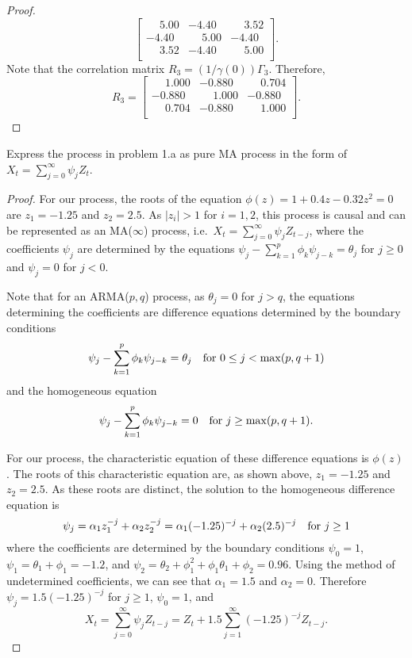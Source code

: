 \documentclass[12pt]{article}
\theoremstyle{definition}
\newenvironment{custompbm}[1]
  {\renewcommand\theproblem{#1}\problem}
  {\endproblem}
\begin{document}
\begin{proof}
\[\begin{bmatrix}
      \phantom{-}5.00  & -4.40 & \phantom{-}3.52 \\
      -4.40 & \phantom{-}5.00  & -4.40  \\
      \phantom{-}3.52 & -4.40 & \phantom{-}5.00  \\
    \end{bmatrix}.
  \]
  Note that the correlation matrix $R_3 = (1/\gamma(0))\Gamma_3$. Therefore,
  \[
    R_3 =
    \begin{bmatrix}
      \phantom{-}1.000  & -0.880 & \phantom{-}0.704 \\
      -0.880 & \phantom{-}1.000  & -0.880  \\
      \phantom{-}0.704 & -0.880 & \phantom{-}1.000  \\
    \end{bmatrix}.
  \]

\end{proof}


\begin{custompbm}{1.c}
  Express the process in problem 1.a as pure MA process in the form of $X_t = \sum_{j=0}^\infty\psi_jZ_t$.
\end{custompbm}

\begin{proof}
  For our process, the roots of the equation $\phi(z) = 1 + 0.4 z - 0.32 z^2 = 0$ are
  $z_1 = -1.25$ and $z_2 = 2.5$. As $|z_i| > 1$ for $i=1,2$, this process is causal and
  can be represented as an MA($\infty$) process, i.e.\ $X_t = \sum_{j=0}^\infty \psi_j Z_{t-j}$,
  where the coefficients $\psi_j$ are determined by the equations $\psi_j - \sum_{k=1}^p \phi_k\psi_{j-k} = \theta_j$
  for $j \geq 0$ and $\psi_j = 0$ for $j < 0$.

  Note that for an ARMA($p, q$) process, as $\theta_j = 0$ for $j > q$, the equations
  determining the coefficients are difference equations determined by the boundary conditions
  \[
    \psi_j - \sum_{k=1}^p \phi_k \psi_{j-k} = \theta_j \text{\quad \text{for $0 \leq j < \max(p, q+1)$}}
  \]
  and the homogeneous equation
  \[
    \psi_j - \sum_{k=1}^p \phi_k \psi_{j-k} = 0 \text{\quad \text{for $j \geq \max(p, q+1)$}}.
  \]

  For our process, the characteristic equation of these difference equations is $\phi(z)$. The roots
  of this characteristic equation are, as shown above, $z_1 = -1.25$ and $z_2 = 2.5$. As these roots
  are distinct, the solution to the homogeneous difference equation is
  \[
    \psi_j = \alpha_1 z_1 ^ {-j} + \alpha_2 z_2 ^{-j} = \alpha_1 (-1.25)^{-j} + \alpha_2 (2.5)^{-j} \text{\quad for $j \geq 1$}
  \]
  where the coefficients are determined by the boundary conditions $\psi_0 = 1$,
  $\psi_1 = \theta_1 + \phi_1 = -1.2$, and $\psi_2 = \theta_2 + \phi_1^2 + \phi_1\theta_1 + \phi_2 = 0.96$.
  Using the method of undetermined coefficients, we can see that $\alpha_1 = 1.5$ and $\alpha_2 = 0$.
  Therefore $\psi_j = 1.5(-1.25)^{-j}$ for $j \geq 1$, $\psi_0 = 1$, and
  \[
    X_t = \sum_{j=0}^\infty\psi_j Z_{t-j} = Z_t + 1.5 \sum_{j=1}^\infty (-1.25)^{-j}Z_{t-j}.
  \]
\end{proof}
\end{document}
